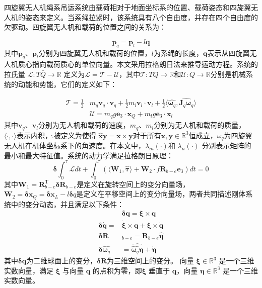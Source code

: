 \documentclass[lang=chs, degree=master, blindreview=false, winfonts=true]{yanputhesis}
\begin{document}
四旋翼无人机绳系吊运系统由载荷相对于地面坐标系的位置、载荷姿态和四旋翼无人机的姿态来定义。当系绳拉紧时，该系统具有八个自由度，并存在四个自由度的欠驱动。四旋翼无人机和载荷的位置之间的关系为：

\begin{equation}
	\bm p_q=\bm p_l-l\bm q
\end{equation}
其中$\bm p_q$、$\bm p_l$分别为四旋翼无人机和载荷的位置，$l$为系绳的长度，$\bm q$表示从四旋翼无人机质心指向载荷质心的单位向量。本文采用拉格朗日法来推导运动方程。系统的拉氏量 $\mathcal{L}:T\bar{Q}\to\mathbb{R}$ 定义为$\mathcal{L}=\mathcal{T}-\mathcal{U}$，其中$\mathcal{T}:TQ\to\mathbb{R}$和${\mathcal{U}}:Q\to\mathbb{R}$分别是机械系统的动能和势能，它们的定义如下：

\begin{equation}
\begin{aligned}
	\mathcal{T}=\frac{1}{2}&m_{q}\bm v_{q}\cdot \bm v_{q}+\frac{1}{2}m_{l}\bm v_{l}\cdot \bm v_{l}+\frac{1}{2}\langle\hat{\bm  \omega_q},\widehat{\bm J_{q}\bm  \omega_q}\rangle\\
	&\mathcal{U}=m_{q}g\bm e_{3}\cdot \bm x_{Q}+m_{l}g\bm e_{3}\cdot \bm x_{l}
\end{aligned}
	\label{2-9}
\end{equation}
其中$\bm v_q$、$\bm v_l$分别为无人机和载荷的速度，$m_q$、$m_l$分别为无人机和载荷的质量，$\langle\cdot,\cdot\rangle $表示内积，$\hat{.}$被定义为使得 $\hat{\bm x}\bm y=\bm x\times \bm y$对于所有$\bm x,\bm y\in\mathbb{R}^3$恒成立，$\omega_q$为四旋翼无人机在机体坐标系下的角速度。在本文中，$\lambda_m(\cdot)$和 $\lambda_n(\cdot)$ 分别表示矩阵的最小和最大特征值。系统的动力学满足拉格朗日原理：
\begin{equation}
	\bm \delta\int_0^\tau\mathcal{L} dt+\int_0^\tau\left(\langle \bm W_1,\hat{\bm \tau}\rangle+\bm W_2\cdot f\bm{R}_{b-e}\bm e_3\right) dt=0
	\label{2-10}
\end{equation}
其中$\bm W_{1}=\bm R_{b-e}^\mathrm{T}\bm \delta \bm R_{b-e}$是定义在旋转空间上的变分向量场， $ \bm W_{2}=\bm \delta \bm x_{Q}=\bm \delta \bm x_{L}-l\bm \delta q$是定义在平移空间上的变分向量场，两者共同描述刚体系统中的变分动态，并且满足以下条件：
\begin{equation}
	\begin{aligned}
	&\bm \delta \bm q = \bm \xi \times \bm q\\
	\bm \delta \dot{\bm q} = &\dot{\bm \xi} \times \bm q + \bm \xi \times \dot{\bm q} \\
	\bm \delta\bm  R&_{b-e} = \bm R_{b-e} \hat{\bm \eta} \\
	\bm \delta \hat{\bm  \omega _q}& = \widehat{\hat{\bm  \omega_q} \bm \eta} + \hat{\dot{\bm \eta}}
\end{aligned}
\end{equation}
其中$\bm \delta \bm q$为二维球面上的变分，$\bm \delta \bm R$为三维空间上的变分。
向量 $\bm{\xi} \in \mathbb{R}^3$ 是一个三维实数向量，满足 $\bm{\xi}$ 与向量 $\bm{q}$ 的点积为零，即$\bm{\xi}$ 垂直于 $\bm{q}$，向量 $\bm{\eta} \in \mathbb{R}^3$ 是一个三维实数向量。
\end{document}
